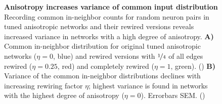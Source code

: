 \begin{figure}[H]
  \centering
  \captionsetup{skip=7pt}
  \caption{\textbf{Anisotropy increases variance of common input
      distribution} Recording common in-neighbor counts for random
    neuron pairs in tuned anisotropic networks and their rewired
    versions reveals increased variance in networks with a high degree
    of anisotropy. \textbf{A)} Common in-neighbor distribution for
    original tuned anisotropic networks ($\eta = 0$, blue) and rewired
    versions with $\nicefrac{1}{4}$ of all edges rewired ($\eta =
    0.25$, red) and completely rewired ($\eta =1 $, green).
    () \textbf{B)} Variance of the common
    in-neighbor distributions declines with increasing rewiring factor
    $\eta$; highest variance is found in networks with the highest
    degree of anisotropy ($\eta = 0$). Errorbars SEM. ()}
  \label{fig:common_input_rew}
\end{figure}


